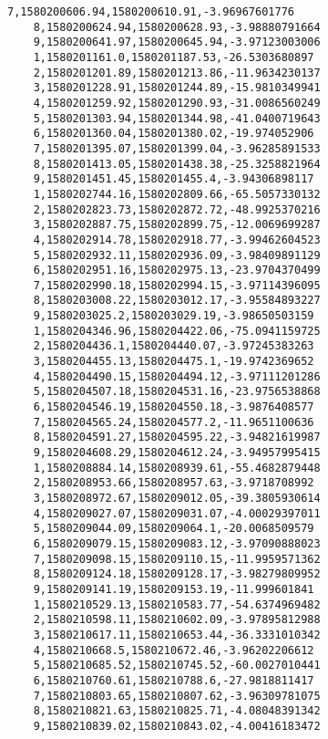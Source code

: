 \begin{lstlisting}[caption=log\_data.csv,label=log_data]
    7,1580200606.94,1580200610.91,-3.96967601776
    8,1580200624.94,1580200628.93,-3.98880791664
    9,1580200641.97,1580200645.94,-3.97123003006
    1,1580201161.0,1580201187.53,-26.5303680897
    2,1580201201.89,1580201213.86,-11.9634230137
    3,1580201228.91,1580201244.89,-15.9810349941
    4,1580201259.92,1580201290.93,-31.0086560249
    5,1580201303.94,1580201344.98,-41.0400719643
    6,1580201360.04,1580201380.02,-19.974052906
    7,1580201395.07,1580201399.04,-3.96285891533
    8,1580201413.05,1580201438.38,-25.3258821964
    9,1580201451.45,1580201455.4,-3.94306898117
    1,1580202744.16,1580202809.66,-65.5057330132
    2,1580202823.73,1580202872.72,-48.9925370216
    3,1580202887.75,1580202899.75,-12.0069699287
    4,1580202914.78,1580202918.77,-3.99462604523
    5,1580202932.11,1580202936.09,-3.98409891129
    6,1580202951.16,1580202975.13,-23.9704370499
    7,1580202990.18,1580202994.15,-3.97114396095
    8,1580203008.22,1580203012.17,-3.95584893227
    9,1580203025.2,1580203029.19,-3.98650503159
    1,1580204346.96,1580204422.06,-75.0941159725
    2,1580204436.1,1580204440.07,-3.97245383263
    3,1580204455.13,1580204475.1,-19.9742369652
    4,1580204490.15,1580204494.12,-3.97111201286
    5,1580204507.18,1580204531.16,-23.9756538868
    6,1580204546.19,1580204550.18,-3.9876408577
    7,1580204565.24,1580204577.2,-11.9651100636
    8,1580204591.27,1580204595.22,-3.94821619987
    9,1580204608.29,1580204612.24,-3.94957995415
    1,1580208884.14,1580208939.61,-55.4682879448
    2,1580208953.66,1580208957.63,-3.9718708992
    3,1580208972.67,1580209012.05,-39.3805930614
    4,1580209027.07,1580209031.07,-4.00029397011
    5,1580209044.09,1580209064.1,-20.0068509579
    6,1580209079.15,1580209083.12,-3.97090888023
    7,1580209098.15,1580209110.15,-11.9959571362
    8,1580209124.18,1580209128.17,-3.98279809952
    9,1580209141.19,1580209153.19,-11.999601841
    1,1580210529.13,1580210583.77,-54.6374969482
    2,1580210598.11,1580210602.09,-3.97895812988
    3,1580210617.11,1580210653.44,-36.3331010342
    4,1580210668.5,1580210672.46,-3.96202206612
    5,1580210685.52,1580210745.52,-60.0027010441
    6,1580210760.61,1580210788.6,-27.9818811417
    7,1580210803.65,1580210807.62,-3.96309781075
    8,1580210821.63,1580210825.71,-4.08048391342
    9,1580210839.02,1580210843.02,-4.00416183472
\end{lstlisting}

